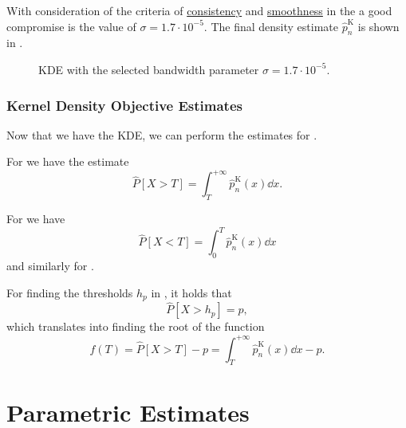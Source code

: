 With consideration of the criteria of \hyperref[itm:desc_cues_consistency]{consistency} and \hyperref[itm:desc_cues_smoothness]{smoothness} in the
 a good compromise is the value of \(\sigma = 1.7\cdot 10^{-5}\). The final density estimate 
\(\hat{p}^{\text{K}}_{n}\) is shown in .

\begin{figure}[H]
    \centering
    \caption{\ac{KDE} with the selected bandwidth parameter \(\sigma = 1.7\cdot 10^{-5}\).}
    \label{fig:kde_choice_plane}
\end{figure}

\subsubsection{Kernel Density Objective Estimates}%
\label{ssub:kernel_density_objective_estimates}

Now that we have the \ac{KDE}, we can perform the estimates for .

For  we have the estimate
\[
    \hat{P}[ X > T ] = \int_{T}^{+\infty} \hat{p}_{n}^{\text{K}}(x) \dd{x}.
\]

\begin{table}[h!]
    \centering
    
\end{table}

For  we have
\[
     \hat{P}[ X < T ] = \int^{T}_{0} \hat{p}_{n}^{\text{K}}(x) \dd{x}
 \] and similarly for .

\begin{table}[h!]
    \centering
    
\end{table}

For finding the thresholds \(h_{p}\) in , it holds that
\[
    \hat{P}[ X > h_{p} ] = p,
\]
which translates into finding the root of the function 
\[
    f(T) = \hat{P}[ X > T ] - p = \int_{T}^{+\infty} \hat{p}_{n}^{\text{K}}(x) \dd{x} - p.
\] 


\begin{table}[h!]
    \centering
    
\end{table}

\section{Parametric Estimates}%
\label{sec:parametric_estimates}

